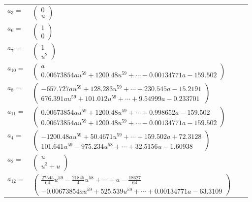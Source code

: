 \documentclass[1p]{elsarticle_modified}
\theoremstyle{definition}
\begin{document}
\begin{tabular}{m{7pt} m{180pt} m{7pt} m{180pt} }
\flushright $a_{3}=$&$\begin{pmatrix}0\\u\end{pmatrix}$ \\
\flushright $a_{6}=$&$\begin{pmatrix}1\\0\end{pmatrix}$ \\
\flushright $a_{7}=$&$\begin{pmatrix}1\\u^2\end{pmatrix}$ \\
\flushright $a_{10}=$&$\begin{pmatrix}a\\0.00673854 a u^{59}+1200.48 u^{59}+\cdots-0.00134771 a-159.502\end{pmatrix}$ \\
\flushright $a_{8}=$&$\begin{pmatrix}-657.727 a u^{59}+128.283 u^{59}+\cdots+230.545 a-15.2191\\676.391 a u^{59}+101.012 u^{59}+\cdots+9.54999 a-0.233701\end{pmatrix}$ \\
\flushright $a_{11}=$&$\begin{pmatrix}0.00673854 a u^{59}+1200.48 u^{59}+\cdots+0.998652 a-159.502\\0.00673854 a u^{59}+1200.48 u^{59}+\cdots-0.00134771 a-159.502\end{pmatrix}$ \\
\flushright $a_{4}=$&$\begin{pmatrix}-1200.48 a u^{59}+50.4671 u^{59}+\cdots+159.502 a+72.3128\\101.641 u^{59}-975.234 u^{58}+\cdots+32.5156 u-1.60938\end{pmatrix}$ \\
\flushright $a_{2}=$&$\begin{pmatrix}u\\u^3+u\end{pmatrix}$ \\
\flushright $a_{12}=$&$\begin{pmatrix}\frac{27545}{64} u^{59}-\frac{21845}{4} u^{58}+\cdots+a-\frac{18627}{64}\\-0.00673854 a u^{59}+525.539 u^{59}+\cdots+0.00134771 a-63.3109\end{pmatrix}$ \\

\end{tabular}
\end{document}

